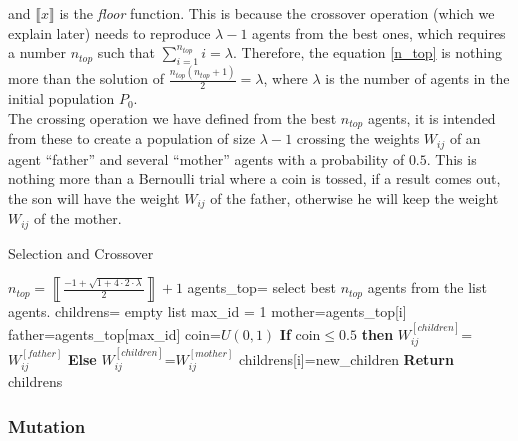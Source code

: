 \documentclass{iosart2c}
\begin{document}
and $\llbracket x\rrbracket$ is the \textit{floor} function. This is because the crossover operation (which we explain later) needs to reproduce $\lambda-1$ agents from the best ones, which requires a number $n_{top}$ such that $\sum_{i=1}^{n_{top}} i=\lambda$. Therefore, the equation \ref{n_top} is nothing more than the solution of $\frac{n_{top}(n_{top}+1)}{2}=\lambda$, where $\lambda$ is the number of agents in the initial population $P_0$. \\

The crossing operation we have defined from the best $n_{top}$ agents, it is intended from these to create a population of size $\lambda-1$ crossing the weights $W_{ij}$ of an agent ``father'' and several ``mother'' agents with a probability of $0.5$. This is nothing more than a Bernoulli trial where a coin is tossed, if a result comes out, the son will have the weight $W_{ij}$ of the father, otherwise he will keep the weight $W_{ij}$ of the mother.




\begin{algorithm}[h!]
\caption{Selection and Crossover}\label{selec_cross}
\begin{algorithmic}[1]
\State $n_{top}=\left\llbracket\frac{-1+\sqrt{1+4\cdot2\cdot\lambda}}{2}\right\rrbracket+1$
\State agents\_top= select best $n_{top}$ agents from the list agents.
\State childrens= empty list
\State max\_id = 1 
\State mother=agents\_top[i] 
\State father=agents\_top[max\_id] 
\State coin=$U(0,1)$ 
\State \textbf{If} coin$\leq0.5$ \textbf{then}
\State \hspace{0.5cm} $W_{ij}^{[children]}$=$W_{ij}^{[father]}$ 
\State \textbf{Else}
\State \hspace{0.5cm} $W_{ij}^{[children]}$=$W_{ij}^{[mother]}$ 
\EndFor
childrens[i]=new\_children
\EndFor
\EndWhile
\State \textbf{Return} childrens
\EndFunction
\end{algorithmic}
\end{algorithm}



\subsubsection{Mutation}
\end{document}
